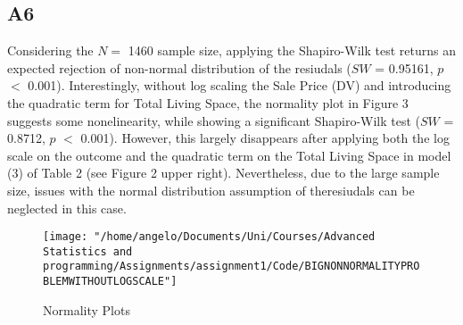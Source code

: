 \documentclass[a4paper]{article}
\begin{document}
\subsection{A6}
Considering the $N=$ 1460 sample size, applying the Shapiro-Wilk test returns an expected rejection of non-normal distribution of the resiudals ($SW$ = 0.95161,  $p$ $<$ 0.001). Interestingly, without log scaling the Sale Price (DV) and introducing the quadratic term for Total Living Space, the normality plot in Figure 3 suggests some nonelinearity, while showing a significant Shapiro-Wilk test ($SW$ = 0.8712,  $p$ $<$ 0.001). However, this largely disappears after applying both the log scale on the outcome and the quadratic term on the Total Living Space in model (3) of Table 2 (see Figure 2 upper right). Nevertheless, due to the large sample size, issues with the normal distribution assumption of theresiudals can be neglected in this case. 



\begin{figure}

         \texttt{[image: "/home/angelo/Documents/Uni/Courses/Advanced Statistics and programming/Assignments/assignment1/Code/BIGNONNORMALITYPROBLEMWITHOUTLOGSCALE"]}
         \small
         \caption{Normality Plots}
\end{figure}
\end{document}
